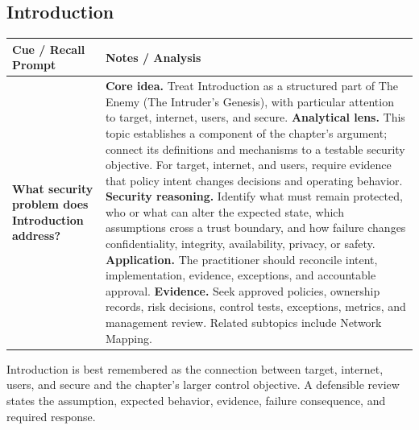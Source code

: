 \documentclass[11pt]{article}
\newcommand{\CornellHeader}{%
\rowcolor{Navy}\color{white}\bfseries Cue / Recall Prompt & \color{white}\bfseries Notes / Analysis\\\hline}
\newcommand{\CornellRow}[2]{%
\cellcolor{CueGray}\RaggedRight\textbf{#1} & \RaggedRight #2\\\hline}
\begin{document}
\subsection*{Introduction}
\begin{longtable}{>{\RaggedRight\arraybackslash}p{}|>{\RaggedRight\arraybackslash}p{}}
\CornellHeader
\CornellRow{What security problem does Introduction address?}{\textbf{Core idea.} Treat Introduction as a structured part of The Enemy (The Intruder's Genesis), with particular attention to target, internet, users, and secure. \textbf{Analytical lens.} This topic establishes a component of the chapter's argument; connect its definitions and mechanisms to a testable security objective. For target, internet, and users, require evidence that policy intent changes decisions and operating behavior. \textbf{Security reasoning.} Identify what must remain protected, who or what can alter the expected state, which assumptions cross a trust boundary, and how failure changes confidentiality, integrity, availability, privacy, or safety. \textbf{Application.} The practitioner should reconcile intent, implementation, evidence, exceptions, and accountable approval. \textbf{Evidence.} Seek approved policies, ownership records, risk decisions, control tests, exceptions, metrics, and management review. Related subtopics include Network Mapping.}
\end{longtable}
\begin{topicsummary}
Introduction is best remembered as the connection between target, internet, users, and secure and the chapter's larger control objective. A defensible review states the assumption, expected behavior, evidence, failure consequence, and required response.
\end{topicsummary}
\end{document}
